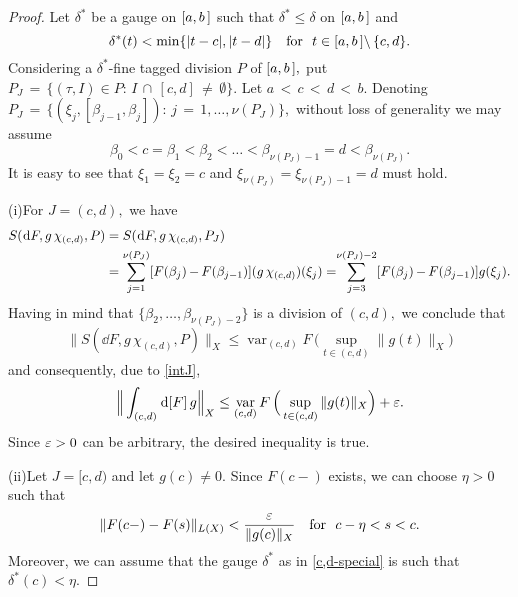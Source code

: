 \documentclass[12pt,twoside]{article}
\numberwithin{equation}{section}
\theoremstyle{plain}
\theoremstyle{definition}
\DeclareMathOperator{\var}{var}
\begin{document}
{\begin{proof}
\smallskip

Let $\delta^*$ be a gauge on $[a,b\,]$ such that $\delta^*\le\delta$ on $[a,b\,]$ and
\begin{equation}\label{c,d-special}
  \delta^*(t)<\min\{|t-c|,|t-d|\}
  \quad\mbox{for \ }t\in\ab{\setminus}\,\{c,d\}.
\end{equation}
Considering a $\delta^*$-fine tagged division $P$ of $[a,b\,],$ put
$P_J\,{=}\,\{(\tau,I)\in P{:}\,I\,{\cap}\,[c,d]\,{\ne}\,\emptyset\}.$
Let $a\,{<}\,c\,{<}\,d\,{<}\,b.$ Denoting
$P_J\,{=}\,\{(\xi_j,[\beta_{j{-}1},\beta_j]){:}\,j\,{=}\,1,\dots,\nu(P_J)\},$
without loss of generality we may assume
\begin{equation}\label{P}
   \beta_0<c=\beta_1<\beta_2<\dots<\beta_{\nu(P_J)-1}=d<\beta_{\nu(P_J)}.
\end{equation}
It is easy to see that $\xi_1=\xi_2=c$ and $\xi_{\nu(P_J)}=\xi_{\nu(P_J){-}1}=d$
must hold.

\skipaline

\noindent (i)\quad For $J=(c,d),$ we have
\[
  \begin{split}
    S(\hskip0.2mm\mbox{\rm d} F,g\,\chi_{(c,d)},P)&=S(\hskip0.2mm\mbox{\rm d} F,g\,\chi_{(c,d)},P_J)
   \\
	&=\sum_{j=1}^{\nu(P_J)}[F(\beta_j)\,{-}\,F(\beta_{j-1})](g\,\chi_{(c,d)})(\xi_j)
     =\hskip-1mm\sum_{j=3}^{\nu(P_J)-2}[F(\beta_j)\,{-}\,F(\beta_{j-1})]g(\xi_j).
  \end{split}
\]
Having in mind that $\{\beta_2,\dots,\beta_{\nu(P_J)-2}\}$ is a division of $(c,d),$
we conclude that
\[
  \|S(\dd F,g\,\chi_{(c,d)},P)\|_X\le\var_{(c,d)}F\,\Big(\sup_{t\in(c,d)}\|g(t)\|_X\Big)
\]
and consequently, due to \eqref{intJ},
\[
 \Big\|\int_{(c,d)}\dd[F]\,g\Big\|_X
 \le\var_{(c,d)}F\,\Big(\sup_{t\in (c,d)}\|g(t)\|_X\Big)+\eps.
\]
Since $\varepsilon>0$ can be arbitrary, the desired inequality is true.

\skipaline

\noindent (ii)\quad Let $J=[c,d)$ and let $g(c)\ne 0.$ Since $F(c-)$ exists, we
can choose $\eta>0$ such that
\[
   \|F(c-)-F(s)\|_{L(X)}<\frac{\varepsilon}{\|g(c)\|_X} \quad\mbox{for \ }c-\eta<s<c.
\]
Moreover, we can assume that the gauge $\delta^*$ as in \eqref{c,d-special} is such
that $\delta^*(c)<\eta.$


\end{proof}}
\end{document}
